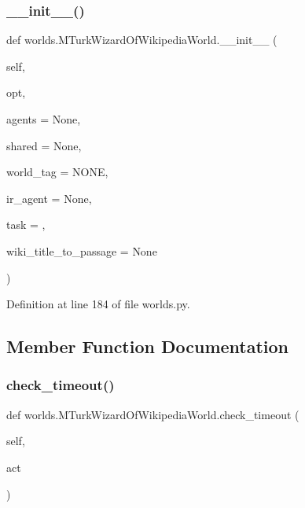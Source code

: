 \subsubsection{\texorpdfstring{\+\_\+\+\_\+init\+\_\+\+\_\+()}{\_\_init\_\_()}}
{\footnotesize\ttfamily def worlds.\+M\+Turk\+Wizard\+Of\+Wikipedia\+World.\+\_\+\+\_\+init\+\_\+\+\_\+ (\begin{DoxyParamCaption}\item[{}]{self,  }\item[{}]{opt,  }\item[{}]{agents = {\ttfamily None},  }\item[{}]{shared = {\ttfamily None},  }\item[{}]{world\+\_\+tag = {\ttfamily \textquotesingle{}NONE\textquotesingle{}},  }\item[{}]{ir\+\_\+agent = {\ttfamily None},  }\item[{}]{task = {\ttfamily \textquotesingle{}\textquotesingle{}},  }\item[{}]{wiki\+\_\+title\+\_\+to\+\_\+passage = {\ttfamily None} }\end{DoxyParamCaption})}



Definition at line 184 of file worlds.\+py.



\subsection{Member Function Documentation}
\mbox{\label{classworlds_1_1MTurkWizardOfWikipediaWorld_a79a5b5c3295a41bf9f35b6fa3e8b0d85}} 
\subsubsection{\texorpdfstring{check\+\_\+timeout()}{check\_timeout()}}
{\footnotesize\ttfamily def worlds.\+M\+Turk\+Wizard\+Of\+Wikipedia\+World.\+check\+\_\+timeout (\begin{DoxyParamCaption}\item[{}]{self,  }\item[{}]{act }\end{DoxyParamCaption})}



